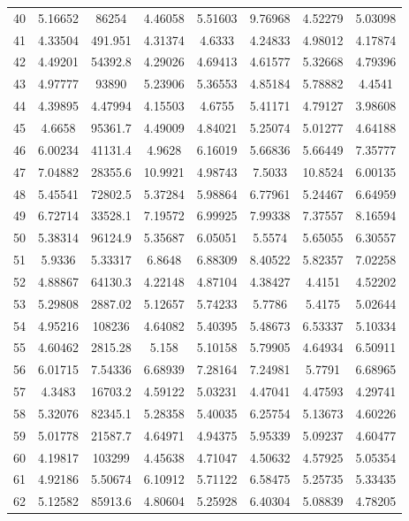 \begin{figure}
\begin{tabular}{cccccccc}
40 & 5.16652 & 86254 & 4.46058 & 5.51603 & 9.76968 & 4.52279 & 5.03098\\
41 & 4.33504 & 491.951 & 4.31374 & 4.6333 & 4.24833 & 4.98012 & 4.17874\\
42 & 4.49201 & 54392.8 & 4.29026 & 4.69413 & 4.61577 & 5.32668 & 4.79396\\
43 & 4.97777 & 93890 & 5.23906 & 5.36553 & 4.85184 & 5.78882 & 4.4541\\
44 & 4.39895 & 4.47994 & 4.15503 & 4.6755 & 5.41171 & 4.79127 & 3.98608\\
45 & 4.6658 & 95361.7 & 4.49009 & 4.84021 & 5.25074 & 5.01277 & 4.64188\\
46 & 6.00234 & 41131.4 & 4.9628 & 6.16019 & 5.66836 & 5.66449 & 7.35777\\
47 & 7.04882 & 28355.6 & 10.9921 & 4.98743 & 7.5033 & 10.8524 & 6.00135\\
48 & 5.45541 & 72802.5 & 5.37284 & 5.98864 & 6.77961 & 5.24467 & 6.64959\\
49 & 6.72714 & 33528.1 & 7.19572 & 6.99925 & 7.99338 & 7.37557 & 8.16594\\
50 & 5.38314 & 96124.9 & 5.35687 & 6.05051 & 5.5574 & 5.65055 & 6.30557\\
51 & 5.9336 & 5.33317 & 6.8648 & 6.88309 & 8.40522 & 5.82357 & 7.02258\\
52 & 4.88867 & 64130.3 & 4.22148 & 4.87104 & 4.38427 & 4.4151 & 4.52202\\
53 & 5.29808 & 2887.02 & 5.12657 & 5.74233 & 5.7786 & 5.4175 & 5.02644\\
54 & 4.95216 & 108236 & 4.64082 & 5.40395 & 5.48673 & 6.53337 & 5.10334\\
55 & 4.60462 & 2815.28 & 5.158 & 5.10158 & 5.79905 & 4.64934 & 6.50911\\
56 & 6.01715 & 7.54336 & 6.68939 & 7.28164 & 7.24981 & 5.7791 & 6.68965\\
57 & 4.3483 & 16703.2 & 4.59122 & 5.03231 & 4.47041 & 4.47593 & 4.29741\\
58 & 5.32076 & 82345.1 & 5.28358 & 5.40035 & 6.25754 & 5.13673 & 4.60226\\
59 & 5.01778 & 21587.7 & 4.64971 & 4.94375 & 5.95339 & 5.09237 & 4.60477\\
60 & 4.19817 & 103299 & 4.45638 & 4.71047 & 4.50632 & 4.57925 & 5.05354\\
61 & 4.92186 & 5.50674 & 6.10912 & 5.71122 & 6.58475 & 5.25735 & 5.33435\\
62 & 5.12582 & 85913.6 & 4.80604 & 5.25928 & 6.40304 & 5.08839 & 4.78205\\

\end{tabular}
\end{figure}
